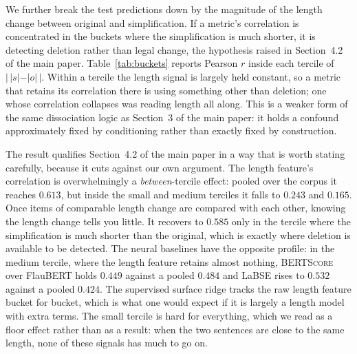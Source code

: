 \documentclass[11pt]{article}
\begin{document}
We further break the test predictions down by the magnitude of the length change
between original and simplification. If a metric's correlation is concentrated
in the buckets where the simplification is much shorter, it is detecting
deletion rather than legal change, the hypothesis raised in
Section~4.2 of the main paper. Table~\ref{tab:buckets} reports Pearson $r$ inside each
tercile of $|\,|s|-|o|\,|$. Within a tercile the length signal is largely held
constant, so a metric that retains its correlation there is using something
other than deletion; one whose correlation collapses was reading length all
along. This is a weaker form of the same dissociation logic as
Section~3 of the main paper: it holds a confound approximately fixed by conditioning
rather than exactly fixed by construction.

\begin{table}[t]\centering\small

\caption{Correlation with the human label \emph{within} terciles of the
absolute length change, pooling test predictions over seeds. Restricting to a
tercile removes most of the length variance; a metric that measures legal
meaning should degrade far less than one that measures deletion.}
\label{tab:buckets}
\end{table}

The result qualifies Section~4.2 of the main paper in a way that is worth stating
carefully, because it cuts against our own argument. The length feature's
correlation is overwhelmingly a \emph{between}-tercile effect: pooled over the
corpus it reaches $0.613$, but inside the small and medium terciles it falls to
$0.243$ and $0.165$. Once items of comparable length change are compared with
each other, knowing the length change tells you little. It recovers to $0.585$
only in the tercile where the simplification is much shorter than the original,
which is exactly where deletion is available to be detected. The neural
baselines have the opposite profile: in the medium tercile, where the length
feature retains almost nothing, \textsc{BERTScore} over FlauBERT holds $0.449$
against a pooled $0.484$ and LaBSE rises to $0.532$ against a pooled $0.424$. The
supervised surface ridge tracks the raw length feature bucket for bucket, which
is what one would expect if it is largely a length model with extra terms. The
small tercile is hard for everything, which we read as a floor effect rather
than as a result: when the two sentences are close to the same length, none of
these signals has much to go on.
\end{document}
